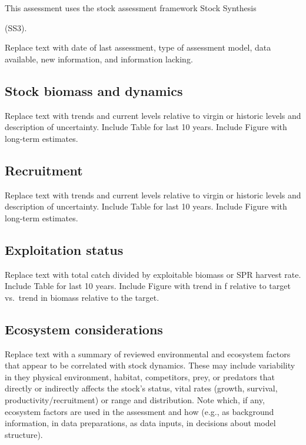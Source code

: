 \documentclass[11pt,
  english,
  letterpaper,
]{article}
\begin{document}
This assessment uses the stock assessment framework Stock Synthesis

(SS3).

Replace text with date of last assessment, type of assessment model, data available, new information, and information lacking.

\hypertarget{stock-biomass-and-dynamics}{%
\subsection*{Stock biomass and dynamics}\label{stock-biomass-and-dynamics}}

Replace text with trends and current levels relative to virgin or historic levels and description of uncertainty. Include Table for last 10 years. Include Figure with long-term estimates.

\hypertarget{recruitment}{%
\subsection*{Recruitment}\label{recruitment}}

Replace text with trends and current levels relative to virgin or historic levels and description of uncertainty. Include Table for last 10 years. Include Figure with long-term estimates.

\hypertarget{exploitation-status}{%
\subsection*{Exploitation status}\label{exploitation-status}}

Replace text with total catch divided by exploitable biomass or SPR harvest rate. Include Table for last 10 years. Include Figure with trend in f relative to target vs.~trend in biomass relative to the target.

\hypertarget{ecosystem-considerations}{%
\subsection*{Ecosystem considerations}\label{ecosystem-considerations}}

Replace text with a summary of reviewed environmental and ecosystem factors that appear to be correlated with stock dynamics. These may include variability in they physical environment, habitat, competitors, prey, or predators that directly or indirectly affects the stock's status, vital rates (growth, survival, productivity/recruitment) or range and distribution. Note which, if any, ecosystem factors are used in the assessment and how (e.g., as background information, in data preparations, as data inputs, in decisions about model structure).
\end{document}
